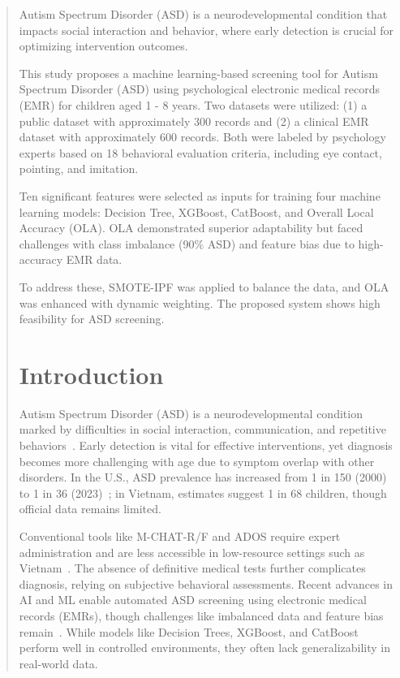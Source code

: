 \documentclass[runningheads]{llncs}
\begin{document}
\begin{abstract}
Autism Spectrum Disorder (ASD) is a neurodevelopmental condition that impacts social interaction and behavior, where early detection is crucial for optimizing intervention outcomes. 

This study proposes a machine learning-based screening tool for Autism Spectrum Disorder (ASD) using psychological electronic medical records (EMR) for children aged 1 - 8 years. Two datasets were utilized: (1) a public dataset with approximately 300 records and (2) a clinical EMR dataset with approximately 600 records. Both were labeled by psychology experts based on 18 behavioral evaluation criteria, including eye contact, pointing, and imitation.

Ten significant features were selected as inputs for training four machine learning models: Decision Tree, XGBoost, CatBoost, and Overall Local Accuracy (OLA). OLA demonstrated superior adaptability but faced challenges with class imbalance (90\% ASD) and feature bias due to high-accuracy EMR data.

To address these, SMOTE-IPF was applied to balance the data, and OLA was enhanced with dynamic weighting. The proposed system shows high feasibility for ASD screening.
\section{Introduction}
Autism Spectrum Disorder (ASD) is a neurodevelopmental condition marked by difficulties in social interaction, communication, and repetitive behaviors~\cite{b1}. Early detection is vital for effective interventions, yet diagnosis becomes more challenging with age due to symptom overlap with other disorders. In the U.S., ASD prevalence has increased from 1 in 150 (2000) to 1 in 36 (2023)~\cite{b2}; in Vietnam, estimates suggest 1 in 68 children, though official data remains limited.

Conventional tools like M-CHAT-R/F and ADOS require expert administration and are less accessible in low-resource settings such as Vietnam~\cite{b3}. The absence of definitive medical tests further complicates diagnosis, relying on subjective behavioral assessments. Recent advances in AI and ML enable automated ASD screening using electronic medical records (EMRs), though challenges like imbalanced data and feature bias remain~\cite{b4}. While models like Decision Trees, XGBoost, and CatBoost perform well in controlled environments, they often lack generalizability in real-world data.


\end{abstract}
\end{document}
